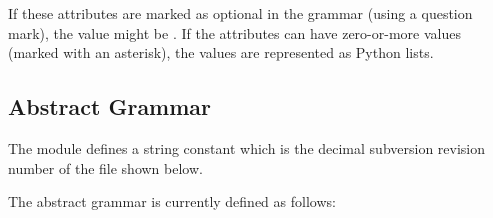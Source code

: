If these attributes are marked as optional in the grammar (using a
question mark), the value might be . If the attributes
can have zero-or-more values (marked with an asterisk), the
values are represented as Python lists.

\subsection{Abstract Grammar}

The module defines a string constant  which
is the decimal subversion revision number of the file shown below.

The abstract grammar is currently defined as follows:

